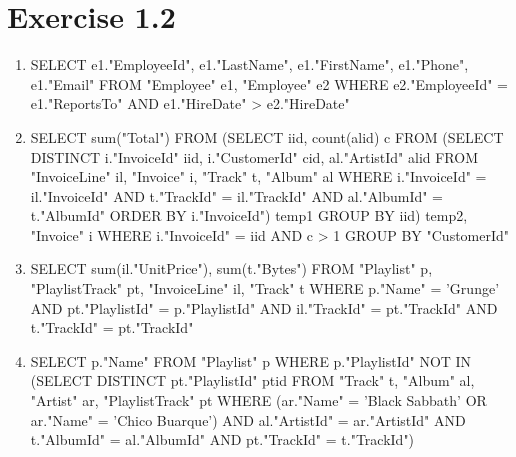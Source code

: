 \documentclass[10pt]{article}
\begin{document}
  \section*{Exercise 1.2}
  \begin{enumerate}[label=\arabic*.]
  \item
 	SELECT e1."EmployeeId", e1."LastName", e1."FirstName", e1."Phone", e1."Email" 
	FROM "Employee" e1, "Employee" e2 
	WHERE e2."EmployeeId" =  e1."ReportsTo" AND e1."HireDate" > e2."HireDate"
  \item
    SELECT sum("Total") FROM 
	(SELECT iid, count(alid) c FROM (SELECT DISTINCT i."InvoiceId" iid, i."CustomerId" cid, al."ArtistId" alid FROM "InvoiceLine" il, "Invoice" i, "Track" t, "Album" al
	WHERE i."InvoiceId" = il."InvoiceId" AND t."TrackId" = il."TrackId" AND al."AlbumId" = t."AlbumId" ORDER BY i."InvoiceId") temp1 GROUP BY iid) temp2,
	"Invoice" i
WHERE
i."InvoiceId" = iid AND c > 1 GROUP BY "CustomerId"
  \item
    SELECT sum(il."UnitPrice"), sum(t."Bytes")
    FROM "Playlist" p, "PlaylistTrack" pt, "InvoiceLine" il, "Track" t
    WHERE p."Name" = 'Grunge' AND pt."PlaylistId" = p."PlaylistId" AND il."TrackId" = pt."TrackId" AND t."TrackId" = pt."TrackId"
  \item
    SELECT p."Name" FROM "Playlist" p
    WHERE p."PlaylistId" NOT IN (SELECT DISTINCT pt."PlaylistId" ptid FROM "Track" t, "Album" al, "Artist" ar, "PlaylistTrack" pt
    WHERE (ar."Name" = 'Black Sabbath' OR ar."Name" = 'Chico Buarque') AND al."ArtistId" = ar."ArtistId" AND t."AlbumId" = al."AlbumId" AND pt."TrackId" = t."TrackId")
\end{enumerate}
\end{document}

